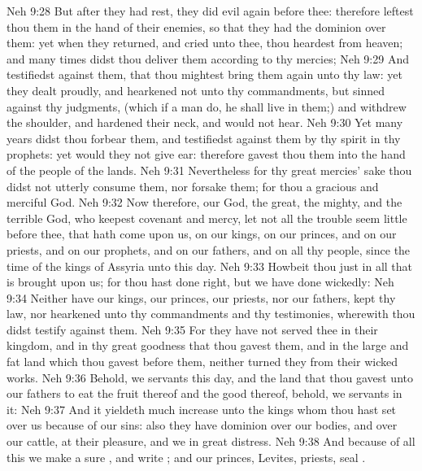 \vs Neh 9:28 But after they had rest, they did evil again before thee: therefore leftest thou them in the hand of their enemies, so that they had the dominion over them: yet when they returned, and cried unto thee, thou heardest  from heaven; and many times didst thou deliver them according to thy mercies;
\vs Neh 9:29 And testifiedst against them, that thou mightest bring them again unto thy law: yet they dealt proudly, and hearkened not unto thy commandments, but sinned against thy judgments, (which if a man do, he shall live in them;) and withdrew the shoulder, and hardened their neck, and would not hear.
\vs Neh 9:30 Yet many years didst thou forbear them, and testifiedst against them by thy spirit in thy prophets: yet would they not give ear: therefore gavest thou them into the hand of the people of the lands.
\vs Neh 9:31 Nevertheless for thy great mercies' sake thou didst not utterly consume them, nor forsake them; for thou  a gracious and merciful God.
\vs Neh 9:32 Now therefore, our God, the great, the mighty, and the terrible God, who keepest covenant and mercy, let not all the trouble seem little before thee, that hath come upon us, on our kings, on our princes, and on our priests, and on our prophets, and on our fathers, and on all thy people, since the time of the kings of Assyria unto this day.
\vs Neh 9:33 Howbeit thou  just in all that is brought upon us; for thou hast done right, but we have done wickedly:
\vs Neh 9:34 Neither have our kings, our princes, our priests, nor our fathers, kept thy law, nor hearkened unto thy commandments and thy testimonies, wherewith thou didst testify against them.
\vs Neh 9:35 For they have not served thee in their kingdom, and in thy great goodness that thou gavest them, and in the large and fat land which thou gavest before them, neither turned they from their wicked works.
\vs Neh 9:36 Behold, we  servants this day, and  the land that thou gavest unto our fathers to eat the fruit thereof and the good thereof, behold, we  servants in it:
\vs Neh 9:37 And it yieldeth much increase unto the kings whom thou hast set over us because of our sins: also they have dominion over our bodies, and over our cattle, at their pleasure, and we  in great distress.
\vs Neh 9:38 And because of all this we make a sure , and write ; and our princes, Levites,  priests, seal .
